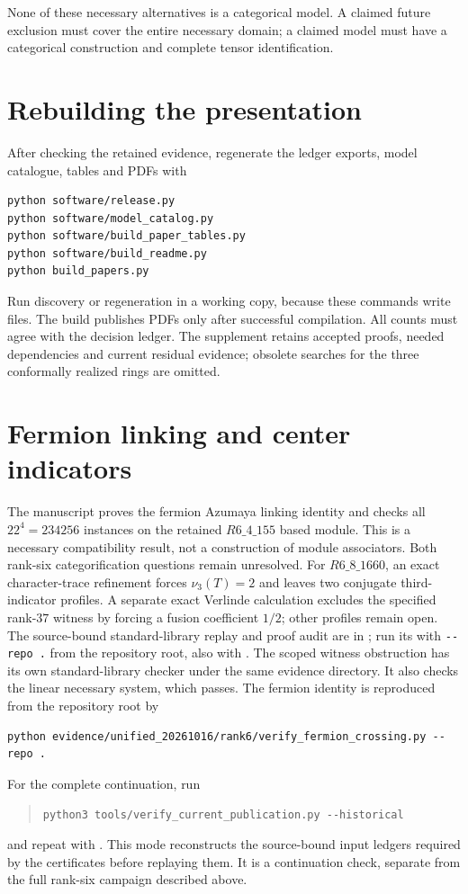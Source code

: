 \documentclass[11pt]{article}
\begin{document}
\begin{samepage}
None of these necessary alternatives is a categorical model. A claimed
future exclusion must cover the entire necessary domain; a claimed model
must have a categorical construction and complete tensor identification.


\section{Rebuilding the presentation}
After checking the retained evidence, regenerate the ledger exports,
model catalogue, tables and PDFs with
\begin{verbatim}
python software/release.py
python software/model_catalog.py
python software/build_paper_tables.py
python software/build_readme.py
python build_papers.py
\end{verbatim}
Run discovery or regeneration in a working copy, because these commands
write files. The build publishes PDFs only after successful compilation.
All counts must agree with the decision ledger. The supplement retains
accepted proofs, needed dependencies and current residual evidence;
obsolete searches for the three conformally realized rings are omitted.
\end{samepage}

\section{Fermion linking and center indicators}
The manuscript proves the fermion Azumaya linking
identity and checks all $22^4=234256$ instances on the retained
$R6\_4\_155$ based module. This is a necessary compatibility result,
not a construction of module associators. Both rank-six categorification
questions remain unresolved. For $R6\_8\_1660$, an exact character-trace
refinement forces $\nu_3(T)=2$ and leaves two conjugate third-indicator
profiles. A separate exact Verlinde calculation excludes the specified
rank-$37$ witness by forcing a fusion coefficient $1/2$; other profiles
remain open. The source-bound
standard-library replay and proof audit are in
; run its
 with \verb|--repo .| from the repository
root, also with . The scoped witness obstruction has its own
standard-library checker
under the same evidence directory. It also checks the linear necessary
system, which passes. The fermion identity is reproduced from the
repository root by
\begin{verbatim}
python evidence/unified_20261016/rank6/verify_fermion_crossing.py --repo .
\end{verbatim}
For the complete continuation, run
\begin{quote}\small
\verb|python3 tools/verify_current_publication.py --historical|
\end{quote}
and repeat with . This mode reconstructs the source-bound
input ledgers required by the certificates before replaying them. It is
a continuation check, separate from the full rank-six campaign described
above.
\end{document}
